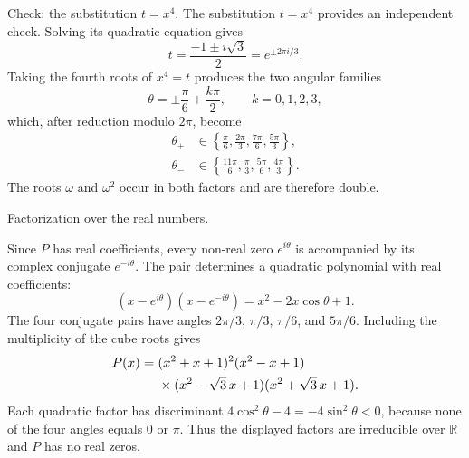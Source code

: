 \documentclass[11pt,aspectratio=169]{beamer}
\newcommand{\slidebody}{%
  \fontsize{10.6}{12.8}\selectfont\justifying%
  \setlength{\parskip}{4.2pt}%
  \setlength{\abovedisplayskip}{4pt}%
  \setlength{\belowdisplayskip}{4pt}%
  \setlength{\abovedisplayshortskip}{2pt}%
  \setlength{\belowdisplayshortskip}{2.5pt}%
}
\newcommand{\tightbody}{\slidebody\fontsize{10.2}{12.3}\selectfont\setlength{\parskip}{3pt}}
\newcommand{\smallequation}{\fontsize{10.5}{13}\selectfont}
\begin{document}
\begin{frame}[t]{Check: the substitution $t=x^4$.}
\tightbody
The substitution $t=x^4$ provides an independent check. Solving its quadratic equation gives
\begin{equation}\label{eq:check-t}
  t=\frac{-1\pm i\sqrt{3}}{2}=e^{\pm2\pi i/3}.
\end{equation}
Taking the fourth roots of $x^4=t$ produces the two angular families
\begin{equation}\label{eq:check-general}
  \theta=\pm\frac{\pi}{6}+\frac{k\pi}{2},\qquad k=0,1,2,3,
\end{equation}
which, after reduction modulo $2\pi$, become
\begin{equation}\label{eq:check-angles}
\begin{aligned}
 \theta_+&\in\left\{\frac{\pi}{6},\frac{2\pi}{3},\frac{7\pi}{6},\frac{5\pi}{3}\right\},\\
 \theta_-&\in\left\{\frac{11\pi}{6},\frac{\pi}{3},\frac{5\pi}{6},\frac{4\pi}{3}\right\}.
\end{aligned}
\end{equation}
The roots $\omega$ and $\omega^2$ occur in both factors and are therefore double.
\end{frame}

\begin{frame}[t]{Factorization over the real numbers.}
\slidebody
Since $P$ has real coefficients, every non-real zero $e^{i\theta}$ is accompanied by its complex conjugate $e^{-i\theta}$. The pair determines a quadratic polynomial with real coefficients:
\begin{equation}\label{eq:real-quadratic}
 (x-e^{i\theta})(x-e^{-i\theta})=x^2-2x\cos\theta+1.
\end{equation}
The four conjugate pairs have angles $2\pi/3$, $\pi/3$, $\pi/6$, and $5\pi/6$. Including the multiplicity of the cube roots gives
\begin{equation}\label{eq:real-factor}
\smallequation
\begin{aligned}
P(x)={}&(x^2+x+1)^2(x^2-x+1)\\
&\times(x^2-\sqrt{3}\,x+1)(x^2+\sqrt{3}\,x+1).
\end{aligned}
\end{equation}
Each quadratic factor has discriminant $4\cos^2\theta-4=-4\sin^2\theta<0$, because none of the four angles equals $0$ or $\pi$. Thus the displayed factors are irreducible over $\mathbb R$ and $P$ has no real zeros.
\end{frame}
\end{document}
